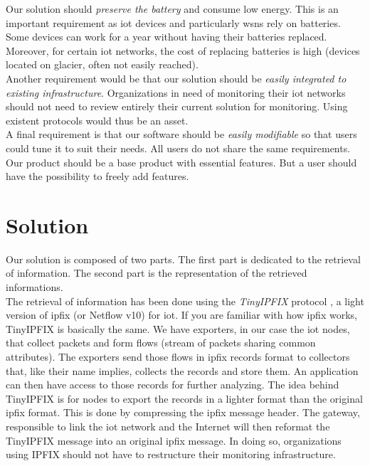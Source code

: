 Our solution should \textit{preserve the battery} and consume low energy. This is an important requirement as \acrshort{iot} devices and particularly \acrshort{wsn}s rely on batteries. Some devices can work for a year without having their batteries replaced. Moreover, for certain \acrshort{iot} networks, the cost of replacing batteries is high (devices located on glacier, often not easily reached).\\

Another requirement would be that our solution should be \textit{easily integrated to existing infrastructure}. Organizations in need of monitoring their \acrshort{iot} networks should not need to review entirely their current solution for monitoring. Using existent protocols would thus be an asset. \\

A final requirement is that our software should be \textit{easily modifiable} so that users could tune it to suit their needs. All users do not share the same requirements. Our product should be a base product with essential features. But a user should have the possibility to freely add features.

\section*{Solution}

Our solution is composed of two parts. The first part is dedicated to the retrieval of information. The second part is the representation of the retrieved informations. \\

The retrieval of information has been done using the \textit{TinyIPFIX} protocol \cite{schmitt2016tinyipfix}, a light version of \acrshort{ipfix} (or Netflow v10) for \acrlong{iot}. If you are familiar with how \acrshort{ipfix} works, TinyIPFIX is basically the same. We have exporters, in our case the \acrshort{iot} nodes, that collect packets and form flows (stream of packets sharing common attributes). The exporters send those flows in \acrshort{ipfix} records format to collectors that, like their name implies, collects the records and store them. An application can then have access to those records for further analyzing. The idea behind TinyIPFIX is for nodes to export the records in a lighter format than the original \acrshort{ipfix} format. This is done by compressing the \acrshort{ipfix} message header. The gateway, responsible to link the \acrshort{iot} network and the Internet will then reformat the TinyIPFIX message into an original \acrshort{ipfix} message. In doing so, organizations using IPFIX should not have to restructure their monitoring infrastructure. \\

